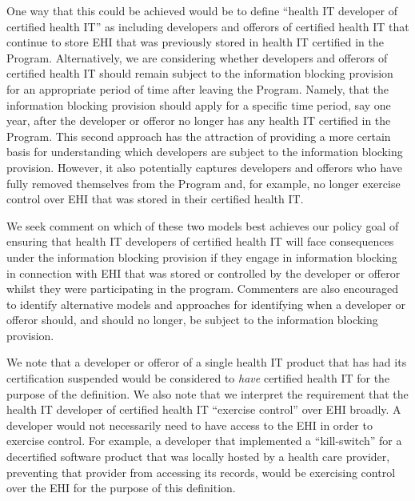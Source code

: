 \documentclass[twoside,11pt]{article}
\begin{document}
          




          One way that this could be achieved would be to define “health IT developer of certified health IT” as including developers and offerors of certified health IT that continue to store EHI that was previously stored in health IT certified in the Program. Alternatively, we are considering whether developers and offerors of certified health IT should remain subject to the information blocking provision for an appropriate period of time after leaving the Program. Namely, that the information blocking provision should apply for a specific time period, say one year, after the developer or offeror no longer has any health IT certified in the Program. This second approach has the attraction of providing a more certain basis for understanding which developers are subject to the information blocking provision. However, it also potentially captures developers and offerors who have fully removed themselves from the Program and, for example, no longer exercise control over EHI that was stored in their certified health IT.


          We seek comment on which of these two models best achieves our policy goal of ensuring that health IT developers of certified health IT will face consequences under the information blocking provision if they engage in information blocking in connection with EHI that was stored or controlled by the developer or offeror whilst they were participating in the program. Commenters are also encouraged to identify alternative models and approaches for identifying when a developer or offeror should, and should no longer, be subject to the information blocking provision.



          We note that a developer or offeror of a single health IT product that has had its certification suspended would be considered to \emph{have} certified health IT for the purpose of the definition. We also note that we interpret the requirement that the health IT developer of certified health IT “exercise control” over EHI broadly. A developer would not necessarily need to have access to the EHI in order to exercise control. For example, a developer that implemented a “kill-switch” for a decertified software product that was locally hosted by a health care provider, preventing that provider from accessing its records, would be exercising control over the EHI for the purpose of this definition.
\end{document}
